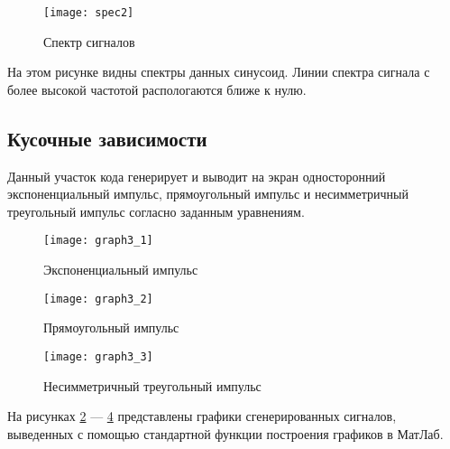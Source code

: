 \begin{figure}[H]
	\begin{center}
		\texttt{[image: spec2]}
		\caption{Спектр сигналов} 
		\label{pic:spech2} %
	\end{center}
\end{figure}
На этом рисунке видны спектры данных синусоид. Линии спектра сигнала с более высокой частотой распологаются ближе к нулю.

\subsection{Кусочные зависимости}


\parindent=1cm
Данный участок кода генерирует и выводит на экран односторонний экспоненциальный импульс, прямоугольный импульс и несимметричный треугольный импульс согласно заданным уравнениям.

\begin{figure}[H]
	\begin{center}
		\texttt{[image: graph3\_1]}
		\caption{Экспоненциальный импульс} 
		\label{pic:graph3_1} %
	\end{center}
\end{figure}
\begin{figure}[H]
	\begin{center}
		\texttt{[image: graph3\_2]}
		\caption{Прямоугольный импульс} 
		\label{pic:graph3_2} %
	\end{center}
\end{figure}
\begin{figure}[H]
	\begin{center}
		\texttt{[image: graph3\_3]}
		\caption{Несимметричный треугольный импульс} 
		\label{pic:graph3_3} %
	\end{center}
\end{figure}
На рисунках  \ref{pic:graph3_1} — \ref{pic:graph3_3} представлены графики сгенерированных сигналов, выведенных с помощью стандартной функции построения графиков в МатЛаб.

